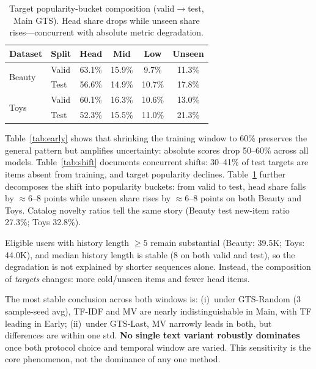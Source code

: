 \documentclass[sigconf,natbib=true,anonymous]{acmart}
\newcommand{\tfidf}{\textsc{TF-IDF}\xspace}
\begin{document}
\begin{table}[t]
\centering
\caption{%
Target popularity-bucket composition (valid$\to$test, Main GTS).
Head share drops while unseen share rises---concurrent with absolute metric degradation.%
}
\label{tab:bucket}
\small
\setlength{\tabcolsep}{3.5pt}
\begin{tabular}{@{}llcccc@{}}
\toprule
Dataset & Split & Head & Mid & Low & Unseen \\
\midrule
\multirow{2}{*}{Beauty}
 & Valid & 63.1\% & 15.9\% & 9.7\% & 11.3\% \\
 & Test  & 56.6\% & 14.9\% & 10.7\% & 17.8\% \\
\midrule
\multirow{2}{*}{Toys}
 & Valid & 60.1\% & 16.3\% & 10.6\% & 13.0\% \\
 & Test  & 52.3\% & 15.5\% & 11.0\% & 21.3\% \\
\bottomrule
\end{tabular}
\end{table}

Table~\ref{tab:early} shows that shrinking the training window to 60\% preserves the general pattern but amplifies uncertainty: absolute scores drop 50--60\% across all models.
Table~\ref{tab:shift} documents concurrent shifts: 30--41\% of test targets are items absent from training, and target popularity declines.
Table~\ref{tab:bucket} further decomposes the shift into popularity buckets: from valid to test, head share falls by $\approx$6--8 points while unseen share rises by $\approx$6--8 points on both Beauty and Toys.
Catalog novelty ratios tell the same story (Beauty test new-item ratio 27.3\%; Toys 32.8\%).

Eligible users with history length $\ge 5$ remain substantial (Beauty: 39.5K; Toys: 44.0K), and median history length is stable (8 on both valid and test), so the degradation is not explained by shorter sequences alone.
Instead, the composition of \emph{targets} changes: more cold/unseen items and fewer head items.

The most stable conclusion across both windows is:
(i)~under GTS-Random (3 sample-seed avg), \tfidf and MV are nearly indistinguishable in Main, with TF leading in Early;
(ii)~under GTS-Last, MV narrowly leads in both, but differences are within one std.
\textbf{No single text variant robustly dominates} once both protocol choice and temporal window are varied.
This sensitivity is the core phenomenon, not the dominance of any one method.
\end{document}
